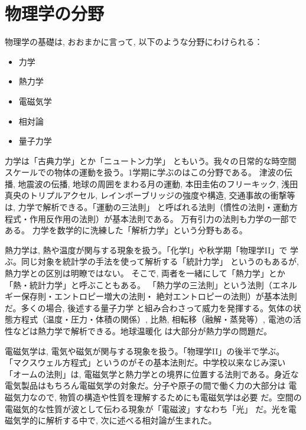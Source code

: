 \section{物理学の分野}

物理学の基礎は, おおまかに言って, 以下のような分野にわけられる：
\begin{itemize}
\item 力学
\item 熱力学
\item 電磁気学
\item 相対論
\item 量子力学
\end{itemize}

力学は「古典力学」とか「ニュートン力学」
ともいう。我々の日常的な時空間
スケールでの物体の運動を扱う。1学期に学ぶのはこの分野である。
津波の伝播, 地震波の伝播, 地球の周囲をまわる月の運動, 本田圭佑のフリーキック, 
浅田真央のトリプルアクセル, レインボーブリッジの強度や構造, 交通事故の衝撃等は, 
力学で解析できる。「運動の三法則」
と呼ばれる法則（慣性の法則・運動方程式・作用反作用の法則）が基本法則である。
万有引力の法則も力学の一部である。
力学を数学的に洗練した「解析力学」という分野もある。

熱力学は, 熱や温度が関与する現象を扱う。「化学I」や秋学期「物理学II」で
学ぶ。同じ対象を統計学の手法を使って解析する「統計力学」
というのもあるが, 熱力学との区別は明瞭ではない。
そこで, 両者を一緒にして「熱力学」とか「熱・統計力学」と呼ぶこともある。
「熱力学の三法則」という法則（エネルギー保存則・エントロピー増大の法則・
絶対エントロピーの法則）が基本法則だ。多くの場合, 後述する量子力学
と組み合わさって威力を発揮する。気体の状態方程式（温度・圧力・体積の関係）, 
比熱, 相転移（融解・蒸発等）, 電池の活性などは熱力学で解析できる。地球温暖化
は大部分が熱力学の問題だ。

電磁気学は, 電気や磁気が関与する現象を扱う。「物理学II」の後半で学ぶ。
「マクスウェル方程式」というのがその基本法則だ。中学校以来なじみ深い
「オームの法則」は, 電磁気学と熱力学との境界に位置する法則である。身近な
電気製品はもちろん電磁気学の対象だ。分子や原子の間で働く力の大部分は
電磁気力なので, 物質の構造や性質を理解するためにも電磁気学は必要
だ。空間の電磁気的な性質が波として伝わる現象が「電磁波」すなわち「光」
だ。光を電磁気学的に解析する中で, 次に述べる相対論が生まれた。

